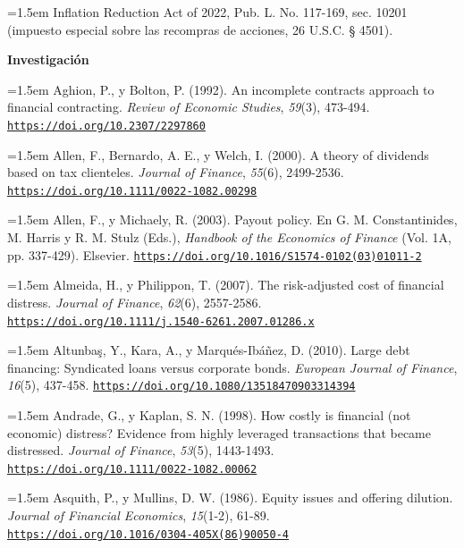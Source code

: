 \documentclass[10pt,a4paper]{article}
\begin{document}
\noindent\hangindent=1.5em Inflation Reduction Act of 2022, Pub. L. No. 117-169, sec. 10201 (impuesto especial sobre las recompras de acciones, 26 U.S.C. § 4501).

\textbf{Investigación}

\noindent\hangindent=1.5em Aghion, P., y Bolton, P. (1992). An incomplete contracts approach to financial contracting. \textit{Review of Economic Studies}, \textit{59}(3), 473-494. \href{https://doi.org/10.2307/2297860}{\nolinkurl{https://doi.org/10.2307/2297860}}

\noindent\hangindent=1.5em Allen, F., Bernardo, A. E., y Welch, I. (2000). A theory of dividends based on tax clienteles. \textit{Journal of Finance}, \textit{55}(6), 2499-2536. \href{https://doi.org/10.1111/0022-1082.00298}{\nolinkurl{https://doi.org/10.1111/0022-1082.00298}}

\noindent\hangindent=1.5em Allen, F., y Michaely, R. (2003). Payout policy. En G. M. Constantinides, M. Harris y R. M. Stulz (Eds.), \textit{Handbook of the Economics of Finance} (Vol. 1A, pp. 337-429). Elsevier. \href{https://doi.org/10.1016/S1574-0102(03)01011-2}{\nolinkurl{https://doi.org/10.1016/S1574-0102(03)01011-2}}

\noindent\hangindent=1.5em Almeida, H., y Philippon, T. (2007). The risk-adjusted cost of financial distress. \textit{Journal of Finance}, \textit{62}(6), 2557-2586. \href{https://doi.org/10.1111/j.1540-6261.2007.01286.x}{\nolinkurl{https://doi.org/10.1111/j.1540-6261.2007.01286.x}}

\noindent\hangindent=1.5em Altunbaş, Y., Kara, A., y Marqués-Ibáñez, D. (2010). Large debt financing: Syndicated loans versus corporate bonds. \textit{European Journal of Finance}, \textit{16}(5), 437-458. \href{https://doi.org/10.1080/13518470903314394}{\nolinkurl{https://doi.org/10.1080/13518470903314394}}

\noindent\hangindent=1.5em Andrade, G., y Kaplan, S. N. (1998). How costly is financial (not economic) distress? Evidence from highly leveraged transactions that became distressed. \textit{Journal of Finance}, \textit{53}(5), 1443-1493. \href{https://doi.org/10.1111/0022-1082.00062}{\nolinkurl{https://doi.org/10.1111/0022-1082.00062}}

\noindent\hangindent=1.5em Asquith, P., y Mullins, D. W. (1986). Equity issues and offering dilution. \textit{Journal of Financial Economics}, \textit{15}(1-2), 61-89. \href{https://doi.org/10.1016/0304-405X(86)90050-4}{\nolinkurl{https://doi.org/10.1016/0304-405X(86)90050-4}}
\end{document}
